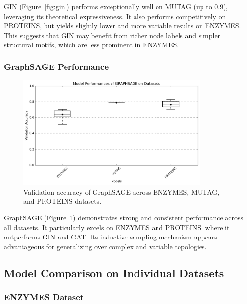 \documentclass[11pt,a4paper]{article}
\begin{document}
	GIN (Figure~\ref{fig:gin}) performs exceptionally well on MUTAG (up to 0.9), leveraging its theoretical expressiveness. It also performs competitively on PROTEINS, but yields slightly lower and more variable results on ENZYMES. This suggests that GIN may benefit from richer node labels and simpler structural motifs, which are less prominent in ENZYMES.
	
	\subsubsection*{GraphSAGE Performance}
	
	\begin{figure}[h]
		\centering
		\includegraphics[width=0.85\textwidth]{boxplot_GRAPHSAGE.png}
		\caption{Validation accuracy of GraphSAGE across ENZYMES, MUTAG, and PROTEINS datasets.}
		\label{fig:graphsage}
	\end{figure}
	
	GraphSAGE (Figure~\ref{fig:graphsage}) demonstrates strong and consistent performance across all datasets. It particularly excels on ENZYMES and PROTEINS, where it outperforms GIN and GAT. Its inductive sampling mechanism appears advantageous for generalizing over complex and variable topologies.
	
	\subsection{Model Comparison on Individual Datasets}
	
	\subsubsection*{ENZYMES Dataset}
	
\end{document}
